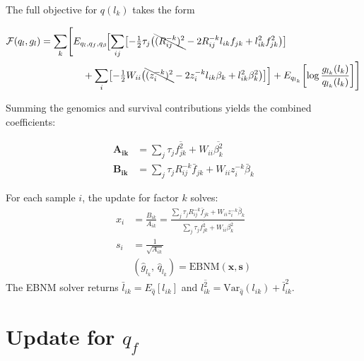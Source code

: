 \documentclass{article}[12pt]
\newcommand{\lbar}[2]{\bar{l}_{#1#2}}
\newcommand{\fbar}[2]{\bar{f}_{#1#2}}
\newcommand{\bbar}[1]{\bar{\beta}_{#1}}
\newcommand{\lsec}[2]{\overline{l^{2}_{#1#2}}}
\newcommand{\fsec}[2]{\overline{f^{2}_{#1#2}}}
\newcommand{\bsec}[1]{\overline{\beta^{2}_{#1}}}
\begin{document}
The full objective for $q(l_k)$ takes the form

\begin{equation}
\begin{aligned}
    \mathcal{F}(q_l, g_l) = \sum_k\Biggl[
    &E_{q_l,q_f,q_\beta}\!\Bigl[\sum_{ij}\bigl[-\tfrac{1}{2}\tau_j
      \bigl(\bcancel{(R^{-k}_{ij})^2} - 2R^{-k}_{ij}l_{ik}f_{jk}
             + l_{ik}^2 f_{jk}^2\bigr)\bigr]\\
    &\quad + \sum_i\bigl[-\tfrac{1}{2}W_{ii}
      \bigl(\bcancel{(z^{-k}_i)^2} - 2z^{-k}_i l_{ik}\beta_k
             + l_{ik}^2\beta_k^2\bigr)\bigr]\Bigr]
      + E_{q_{l_k}}\!\left[\log\frac{g_{l_k}(l_k)}{q_{l_k}(l_k)}\right]\Biggr]
\end{aligned}
\end{equation}

Summing the genomics and survival contributions yields the combined coefficients:

\begin{align}
    \mathbf{A_{ik}} &= \sum_{j}\tau_{j}\fsec{j}{k} + W_{ii}\bsec{k}
    \label{eq:A-L}\\
    \mathbf{B_{ik}} &= \sum_{j}\tau_{j}R^{-k}_{ij}\fbar{j}{k}
                      + W_{ii}z^{-k}_{i}\bbar{k}
    \label{eq:B-L}
\end{align}

\begin{ebnmbox}
For each sample $i$, the update for factor $k$ solves:
\begin{align}
    x_i &= \frac{B_{ik}}{A_{ik}}
         = \frac{\displaystyle\sum_{j}\tau_{j}R^{-k}_{ij}\fbar{j}{k}
                 + W_{ii}z^{-k}_{i}\bbar{k}}
                {\displaystyle\sum_{j}\tau_{j}\fsec{j}{k} + W_{ii}\bsec{k}}
    \label{eq:xi-L}\\[4pt]
    s_i &= \frac{1}{\sqrt{A_{ik}}}
    \label{eq:si-L}\\[4pt]
    &\left(\hat{g}_{l_k},\,\hat{q}_{l_k}\right)
      = \mathrm{EBNM}(\mathbf{x}, \mathbf{s})
\end{align}
The EBNM solver returns $\lbar{i}{k} = E_{\hat{q}}[l_{ik}]$ and
$\lsec{i}{k} = \mathrm{Var}_{\hat{q}}(l_{ik}) + \lbar{i}{k}^2$.
\end{ebnmbox}

\section{Update for $q_{f}$}
\end{document}
